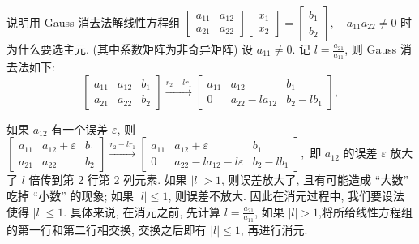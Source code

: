 \begin{tcolorbox}[enhanced,colback=10,colframe=9,breakable,coltitle=green!25!black,title=2024]
 说明用 Gauss 消去法解线性方程组
$
\left[\begin{array}{ll}
a_{11} & a_{12} \\
a_{21} & a_{22}
\end{array}\right]\left[\begin{array}{l}
x_{1} \\
x_{2}
\end{array}\right]=\left[\begin{array}{l}
b_{1} \\
b_{2}
\end{array}\right], \quad a_{11} a_{22} \neq 0
$
时为什么要选主元. (其中系数矩阵为非奇异矩阵)
 \tcblower
 设 $ a_{11} \neq 0 $. 记 $ l=\frac{a_{21}}{a_{11}} $, 则 Gauss 消去法如下:
$$
\left[\begin{array}{lll}
a_{11} & a_{12} & b_{1} \\
a_{21} & a_{22} & b_{2}
\end{array}\right] \xrightarrow{r_{2}-l r_{1}}\left[\begin{array}{ccc}
a_{11} & a_{12} & b_{1} \\
0 & a_{22}-l a_{12} & b_{2}-l b_{1}
\end{array}\right],
$$

如果 $ a_{12} $ 有一个误差 $ \varepsilon $, 则
$
\left[\begin{array}{ccc}
a_{11} & a_{12}+\varepsilon & b_{1} \\
a_{21} & a_{22} & b_{2}
\end{array}\right] \xrightarrow{r_{2}-l r_{1}}\left[\begin{array}{ccc}
a_{11} & a_{12}+\varepsilon & b_{1} \\
0 & a_{22}-l a_{12}-l \varepsilon & b_{2}-l b_{1}
\end{array}\right],
$
即 $ a_{12} $ 的误差 $ \varepsilon $ 放大了 $ l $ 倍传到第 2 行第 2 列元素. 如果 $ |l|>1 $, 则误差放大了, 且有可能造成 “大数” 吃掉 “小数” 的现象; 如果 $ |l| \leqslant 1 $, 则误差不放大. 因此在消元过程中, 我们要设法使得 $ |l| \leqslant 1 $. 具体来说, 在消元之前, 先计算 $ l=\frac{a_{21}}{a_{11}} $, 如果 $ |l|>1 $,将所给线性方程组的第一行和第二行相交换, 交换之后即有 $ |l| \leqslant 1 $, 再进行消元.

 \end{tcolorbox}
